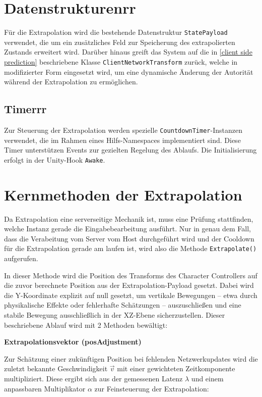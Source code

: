 \begin{enumerate}
\section{Datenstrukturenrr}
Für die Extrapolation wird die bestehende Datenstruktur \texttt{StatePayload} verwendet, die um ein zusätzliches Feld zur Speicherung des extrapolierten Zustands erweitert wird. Darüber hinaus greift das System auf die in \ref{client side prediction} beschriebene Klasse \texttt{ClientNetworkTransform} zurück, welche in modifizierter Form eingesetzt wird, um eine dynamische Änderung der Autorität während der Extrapolation zu ermöglichen.

\subsection{Timerrr}
Zur Steuerung der Extrapolation werden spezielle \texttt{CountdownTimer}-Instanzen verwendet, die im Rahmen eines Hilfs-Namespaces implementiert sind. Diese Timer unterstützen Events zur gezielten Regelung des Ablaufs. Die Initialisierung erfolgt in der Unity-Hook \texttt{Awake}.

\section{Kernmethoden der Extrapolation}
Da Extrapolation eine serverseitige Mechanik ist, muss eine Prüfung stattfinden, welche Instanz gerade die Eingabebearbeitung ausführt.
Nur in genau dem Fall, dass die Verabeitung vom Server vom Host durchgeführt wird und der Cooldown für die Extrapolation gerade am laufen ist, wird also die Methode \texttt{Extrapolate()} aufgerufen.

In dieser Methode wird die Position des Transforms des Character Controllers auf die zuvor berechnete Position aus der Extrapolation-Payload gesetzt. Dabei wird die Y-Koordinate explizit auf null gesetzt, um vertikale Bewegungen – etwa durch physikalische Effekte oder fehlerhafte Schätzungen – auszuschließen und eine stabile Bewegung ausschließlich in der XZ-Ebene sicherzustellen.
Dieser beschriebene Ablauf wird mit 2 Methoden bewältigt:



\newpage

\textbf{Extrapolationsvektor (posAdjustment)}

Zur Schätzung einer zukünftigen Position bei fehlenden Netzwerkupdates wird die zuletzt bekannte Geschwindigkeit $\vec{v}$ mit einer gewichteten Zeitkomponente multipliziert. Diese ergibt sich aus der gemessenen Latenz $\lambda$ und einem anpassbaren Multiplikator $\alpha$ zur Feinsteuerung der Extrapolation:


\end{enumerate}

